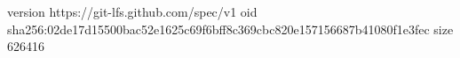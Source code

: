 version https://git-lfs.github.com/spec/v1
oid sha256:02de17d15500bac52e1625c69f6bff8c369cbc820e157156687b41080f1e3fec
size 626416
